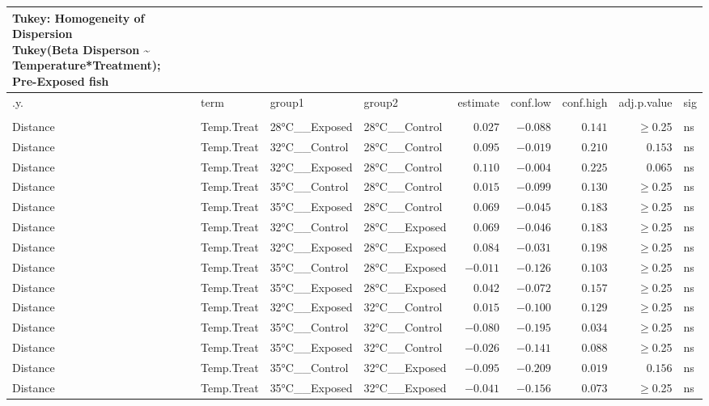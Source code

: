 \documentclass[
]{article}
\begin{document}
\begin{longtable}{llllrrrrl}
\caption*{
{\large Tukey: Homogeneity of Dispersion} \\ 
{\small Tukey(Beta Disperson \textasciitilde{} Temperature*Treatment); Pre-Exposed fish}
} \\ 
\toprule
.y. & term & group1 & group2 & estimate & conf.low & conf.high & adj.p.value & sig \\ 
\midrule\addlinespace[2.5pt]
\multicolumn{9}{l}{bray} \\ 
\midrule\addlinespace[2.5pt]
Distance & Temp.Treat & 28°C\_\_Exposed & 28°C\_\_Control & $0.027$ & $-0.088$ & $0.141$ & $\geq$0.25 & ns \\ 
Distance & Temp.Treat & 32°C\_\_Control & 28°C\_\_Control & $0.095$ & $-0.019$ & $0.210$ & $0.153$ & ns \\ 
Distance & Temp.Treat & 32°C\_\_Exposed & 28°C\_\_Control & $0.110$ & $-0.004$ & $0.225$ & $0.065$ & ns \\ 
Distance & Temp.Treat & 35°C\_\_Control & 28°C\_\_Control & $0.015$ & $-0.099$ & $0.130$ & $\geq$0.25 & ns \\ 
Distance & Temp.Treat & 35°C\_\_Exposed & 28°C\_\_Control & $0.069$ & $-0.045$ & $0.183$ & $\geq$0.25 & ns \\ 
Distance & Temp.Treat & 32°C\_\_Control & 28°C\_\_Exposed & $0.069$ & $-0.046$ & $0.183$ & $\geq$0.25 & ns \\ 
Distance & Temp.Treat & 32°C\_\_Exposed & 28°C\_\_Exposed & $0.084$ & $-0.031$ & $0.198$ & $\geq$0.25 & ns \\ 
Distance & Temp.Treat & 35°C\_\_Control & 28°C\_\_Exposed & $-0.011$ & $-0.126$ & $0.103$ & $\geq$0.25 & ns \\ 
Distance & Temp.Treat & 35°C\_\_Exposed & 28°C\_\_Exposed & $0.042$ & $-0.072$ & $0.157$ & $\geq$0.25 & ns \\ 
Distance & Temp.Treat & 32°C\_\_Exposed & 32°C\_\_Control & $0.015$ & $-0.100$ & $0.129$ & $\geq$0.25 & ns \\ 
Distance & Temp.Treat & 35°C\_\_Control & 32°C\_\_Control & $-0.080$ & $-0.195$ & $0.034$ & $\geq$0.25 & ns \\ 
Distance & Temp.Treat & 35°C\_\_Exposed & 32°C\_\_Control & $-0.026$ & $-0.141$ & $0.088$ & $\geq$0.25 & ns \\ 
Distance & Temp.Treat & 35°C\_\_Control & 32°C\_\_Exposed & $-0.095$ & $-0.209$ & $0.019$ & $0.156$ & ns \\ 
Distance & Temp.Treat & 35°C\_\_Exposed & 32°C\_\_Exposed & $-0.041$ & $-0.156$ & $0.073$ & $\geq$0.25 & ns \\ 

\end{longtable}
\end{document}
